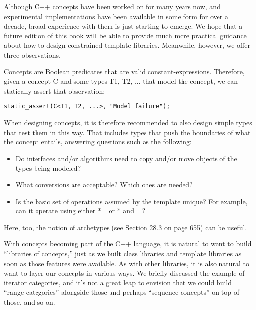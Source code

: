 
Although C++ concepts have been worked on for many years now, and experimental implementations have been available in some form for over a decade, broad experience with them is just starting to emerge. We hope that a future edition of this book will be able to provide much more practical guidance about how to design constrained template libraries. Meanwhile, however, we offer three observations.


Concepts are Boolean predicates that are valid constant-expressions. Therefore, given a concept C and some types T1, T2, ... that model the concept, we can statically assert that observation:

\begin{lstlisting}[style=styleCXX]
static_assert(C<T1, T2, ...>, "Model failure");
\end{lstlisting}

When designing concepts, it is therefore recommended to also design simple types that test them in this way. That includes types that push the boundaries of what the concept entails, answering questions such as the following:

\begin{itemize}
\item 
Do interfaces and/or algorithms need to copy and/or move objects of the types being modeled?

\item 
What conversions are acceptable? Which ones are needed?

\item 
Is the basic set of operations assumed by the template unique? For example, can it operate using either *= or * and =?
\end{itemize}

Here, too, the notion of archetypes (see Section 28.3 on page 655) can be useful.


With concepts becoming part of the C++ language, it is natural to want to build “libraries of concepts,” just as we built class libraries and template libraries as soon as those features were available. As with other libraries, it is also natural to want to layer our concepts in various ways. We briefly discussed the example of iterator categories, and it’s not a great leap to envision that we could build “range categories” alongside those and perhaps “sequence concepts” on top of those, and so on.

